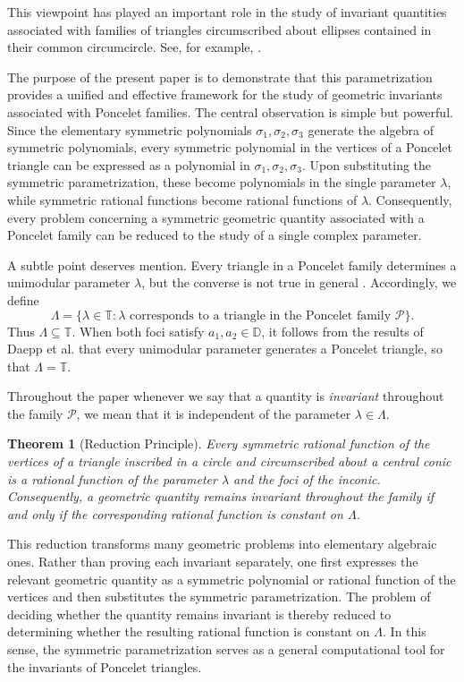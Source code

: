 \documentclass[11pt,reqno]{amsart}
\newtheorem{theorem}{Theorem}[section]
\theoremstyle{definition}
\numberwithin{equation}{section}
\begin{document}
This viewpoint has played an important role in the study of invariant quantities associated with families of triangles circumscribed about ellipses contained in their common circumcircle. See, for example, 
\cite{Helmanetal.2022,Helmanetal.2023,Garciaetal.2026}.

The purpose of the present paper is to demonstrate that this parametrization provides a unified and effective framework for the study of geometric invariants associated with Poncelet families. The central observation is simple but powerful. Since the elementary symmetric polynomials $\sigma_1,\sigma_2,\sigma_3$ generate the algebra of symmetric polynomials, every symmetric polynomial in the vertices of a Poncelet triangle can be expressed as a polynomial in $\sigma_1,\sigma_2,\sigma_3$. Upon substituting the symmetric parametrization, these become polynomials in the single parameter $\lambda$, while symmetric rational functions become rational functions of $\lambda$. Consequently, every problem concerning a symmetric geometric quantity associated with a Poncelet family can be reduced to the study of a single complex parameter.

A subtle point deserves mention. Every triangle in a Poncelet family determines a unimodular parameter $\lambda$, but the converse is not true in general \cite{Murad2026b}. Accordingly, we define
\[
\Lambda=
\{\lambda\in\mathbb T:
\text{$\lambda$ corresponds to a triangle in the Poncelet family }\mathcal P\}.
\]
Thus $\Lambda\subseteq\mathbb T$. When both foci satisfy $a_1,a_2\in\mathbb D$, it follows from the results of Daepp et al. \cite{daepp2002ellipses} that every unimodular parameter generates a Poncelet triangle, so that $\Lambda=\mathbb T$.

Throughout the paper whenever we say that a quantity is \emph{invariant} throughout the family $\mathcal{P}$, we mean that it is independent of the parameter $\lambda\in\Lambda$.

\begin{theorem}[Reduction Principle]
Every symmetric rational function of the vertices of a triangle inscribed in a circle and circumscribed about a central conic is a rational function of the parameter $\lambda$ and the foci of the inconic. Consequently, a geometric quantity remains invariant throughout the family if and only if the corresponding rational function is constant on $\Lambda$.
\end{theorem}

This reduction transforms many geometric problems into elementary algebraic ones. Rather than proving each invariant separately, one first expresses the relevant geometric quantity as a symmetric polynomial or rational function of the vertices and then substitutes the symmetric parametrization. The problem of deciding whether the quantity remains invariant is thereby reduced to determining whether the resulting rational function is constant on $\Lambda$. In this sense, the symmetric parametrization serves as a general computational tool for the invariants of Poncelet triangles.
\end{document}

